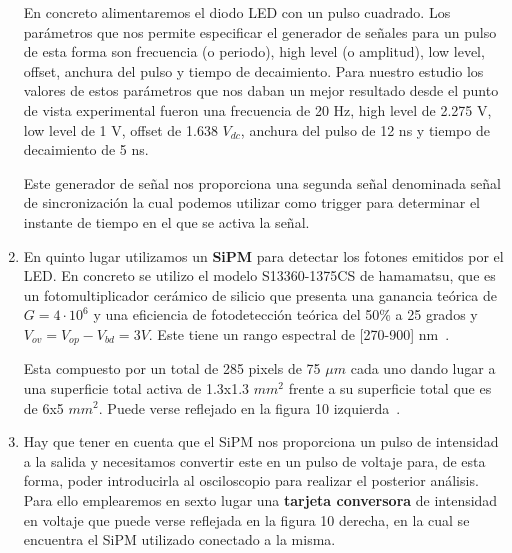 \begin{enumerate}
En concreto alimentaremos el diodo LED con un pulso cuadrado. Los parámetros que nos permite especificar el generador de señales para un pulso de esta forma son frecuencia (o periodo), high level (o amplitud), low level, offset, anchura del pulso y tiempo de decaimiento. Para nuestro estudio los valores de estos parámetros que nos daban un mejor resultado desde el punto de vista experimental fueron una frecuencia de 20 Hz, high level de 2.275 V, low level de 1 V, offset de 1.638 $V_{dc}$, anchura del pulso de 12 ns y tiempo de decaimiento de 5 ns.

Este generador de señal nos proporciona una segunda señal denominada señal de sincronización la cual podemos utilizar como trigger para determinar el instante de tiempo en el que se activa la señal.

\item {} En quinto lugar utilizamos un \textbf{SiPM} para detectar los fotones emitidos por el LED. En concreto se utilizo el modelo S13360-1375CS de hamamatsu, que es un fotomultiplicador cerámico de silicio que presenta una ganancia teórica de $G=4 \cdotp 10^6$ y una eficiencia de fotodetección teórica del 50\% a 25 grados y $V_{ov}=V_{op}-V_{bd}=3V$. Este tiene un rango espectral de [270-900] nm~\cite{datasheet SiPM}.

Esta compuesto por un total de 285 pixels de 75 $\mu m$ cada uno dando lugar a una superficie total activa de 1.3x1.3 $mm^2$ frente a su superficie total que es de 6x5 $mm^2$. Puede verse reflejado en la figura 10 izquierda~\cite{datasheet SiPM}. 

\item {} Hay que tener en cuenta que el SiPM nos proporciona un pulso de intensidad a la salida y  necesitamos convertir este en un pulso de voltaje para, de esta forma, poder introducirla al osciloscopio para realizar el posterior análisis. Para ello emplearemos en sexto lugar una \textbf{tarjeta conversora} de intensidad en voltaje que puede verse reflejada en la figura 10 derecha, en la cual se encuentra el SiPM utilizado conectado a la misma. 


\end{enumerate}
